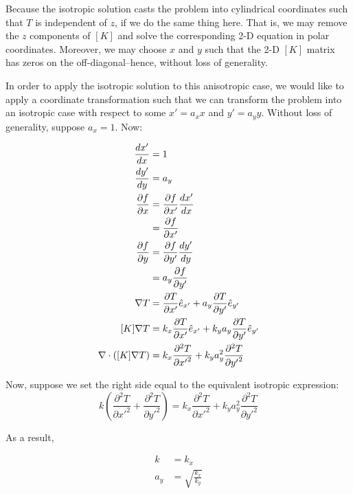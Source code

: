 Because the isotropic solution casts the problem into cylindrical coordinates such that \(T\) is independent of \(z\), if we do the same thing here. That is, we may remove the \(z\) components of \([K]\) and solve the corresponding 2-D equation in polar coordinates. Moreover, we may choose \(x\) and \(y\) such that the 2-D \([K]\) matrix has zeros on the off-diagonal--hence, without loss of generality.

In order to apply the isotropic solution to this anisotropic case, we would like to apply a coordinate transformation such that we can transform the problem into an isotropic case with respect to some \(x' = a_x x\) and \(y' = a_y y\). Without loss of generality, suppose \(a_x = 1\). Now:

\begin{align*}
\frac{dx'}{dx} &= 1\\
\frac{dy'}{dy} &= a_y\\
\frac{\partial f}{\partial x} &= \frac{\partial f}{\partial x'}\frac{dx'}{dx}\\
    &= \frac{\partial f}{\partial x'}\\
\frac{\partial f}{\partial y} &= \frac{\partial f}{\partial y'}\frac{dy'}{dy}\\
    &= a_y\frac{\partial f}{\partial y'}\\
\nabla T &= \frac{\partial T}{\partial x'} \hat{e}_{x'} + a_y\frac{\partial T}{\partial y'} \hat{e}_{y'} \\
[K]\nabla T &= k_x\frac{\partial T}{\partial x'} \hat{e}_{x'} + k_ya_y\frac{\partial T}{\partial y'} \hat{e}_{y'}\\
\nabla \cdot \left([K]\nabla T\right) &= k_x\frac{\partial^2 T}{\partial {x'}^2} + k_ya_y^2\frac{\partial^2 T}{\partial {y'}^2}\\
\end{align*}

Now, suppose we set the right side equal to the equivalent isotropic expression:
\begin{equation*}
k\left(\frac{\partial^2 T}{\partial {x'}^2} + \frac{\partial^2 T}{\partial {y'}^2} \right) = k_x\frac{\partial^2 T}{\partial {x'}^2} + k_ya_y^2\frac{\partial^2 T}{\partial {y'}^2}
\end{equation*}

As a result,

\begin{align*}
k &= k_x\\ a_y &= \sqrt{\frac{k_x}{k_y}}\\
\end{align*}

